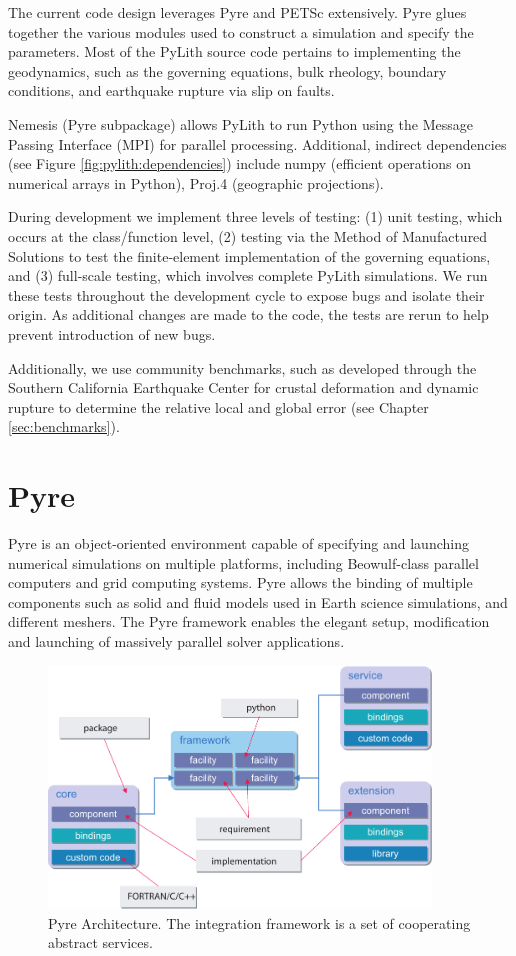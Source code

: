 The current code design leverages Pyre and PETSc extensively. Pyre
glues together the various modules used to construct a simulation and
specify the parameters. Most of the PyLith source code pertains to
implementing the geodynamics, such as the governing equations, bulk
rheology, boundary conditions, and earthquake rupture via slip on
faults.

Nemesis (Pyre subpackage) allows PyLith to run Python using the
Message Passing Interface (MPI) for parallel processing. Additional,
indirect dependencies (see Figure \vref{fig:pylith:dependencies})
include numpy (efficient operations on numerical arrays in Python),
Proj.4 (geographic projections).

During development we implement three levels of testing: (1) unit
testing, which occurs at the class/function level, (2) testing via the
Method of Manufactured Solutions to test the finite-element
implementation of the governing equations, and (3) full-scale testing,
which involves complete PyLith simulations. We run these tests
throughout the development cycle to expose bugs and isolate their
origin. As additional changes are made to the code, the tests are
rerun to help prevent introduction of new bugs.

Additionally, we use community benchmarks, such as developed through
the Southern California Earthquake Center for crustal deformation and
dynamic rupture to determine the relative local and global error (see
Chapter \vref{sec:benchmarks}).

\section{Pyre}

Pyre is an object-oriented environment capable of specifying and launching
numerical simulations on multiple platforms, including Beowulf-class
parallel computers and grid computing systems. Pyre allows the binding
of multiple components such as solid and fluid models used in Earth
science simulations, and different meshers. The Pyre framework enables
the elegant setup, modification and launching of massively parallel
solver applications.

\begin{figure}[htbp]
  \includegraphics[width=4in]{intro/figs/pyre_overview}
  \caption{Pyre Architecture. The integration framework is a set of
    cooperating abstract services.}
  \label{fig:Pyre:architecture}
\end{figure}

